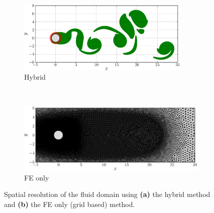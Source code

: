 	\begin{figure}[!t]
     \centering
     \begin{subfigure}[t]{0.49\textwidth}
             \includegraphics[width=0.9\textwidth]{./figures/validation/isc/hybrid_ISC_blobsLoc-crop.png}
             \caption{Hybrid}
             \label{fig:hybrid_ISC_blobsLoc-crop}
     \end{subfigure}%
     ~ %
     \begin{subfigure}[t]{0.49\textwidth}
             \includegraphics[width=\textwidth]{./figures/validation/isc/FE_ISC_mesh-crop.png}
             \caption{FE only}
             \label{fig:FE_ISC_mesh-crop}
     \end{subfigure}
     \caption{Spatial resolution of the fluid domain using \textbf{(a)} the hybrid method and \textbf{(b)} the FE only (grid based) method.}
     \label{fig:hybrid_gridResolution}
	\end{figure}


